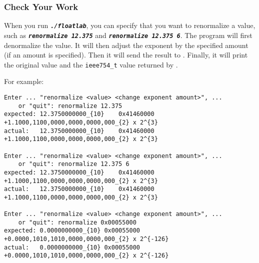 
\subsubsection*{Check Your Work}

When you run \texttt{\textbf{\textit{./floatlab}}}, you can specify that you want to renormalize a value, such as \texttt{\textbf{\textit{renormalize 12.375}}} and \texttt{\textbf{\textit{renormalize 12.375 6}}}.
The program will first denormalize the value.
It will then adjust the exponent by the specified amount (if an amount is specified).
Then it will send the result to .
Finally, it will print the original value and the \lstinline{ieee754_t} value returned by .

For example:

\begin{verbatim}
Enter ... "renormalize <value> <change exponent amount>", ...
    or "quit": renormalize 12.375
expected: 12.3750000000_{10}	0x41460000	+1.1000,1100,0000,0000,0000,000_{2} x 2^{3}
actual:   12.3750000000_{10}	0x41460000	+1.1000,1100,0000,0000,0000,000_{2} x 2^{3}

Enter ... "renormalize <value> <change exponent amount>", ...
    or "quit": renormalize 12.375 6
expected: 12.3750000000_{10}	0x41460000	+1.1000,1100,0000,0000,0000,000_{2} x 2^{3}
actual:   12.3750000000_{10}	0x41460000	+1.1000,1100,0000,0000,0000,000_{2} x 2^{3}

Enter ... "renormalize <value> <change exponent amount>", ...
    or "quit": renormalize 0x00055000
expected: 0.0000000000_{10}	0x00055000	+0.0000,1010,1010,0000,0000,000_{2} x 2^{-126}
actual:   0.0000000000_{10}	0x00055000	+0.0000,1010,1010,0000,0000,000_{2} x 2^{-126}
\end{verbatim}